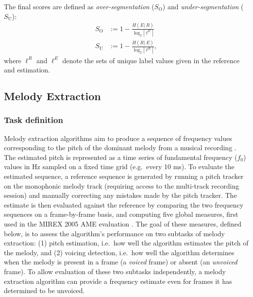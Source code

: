 \documentclass{article}
\def\given{\ensuremath{|~}}
\def\defeq{\ensuremath{:=}}
\begin{document}
The final scores are defined as \emph{over-segmentation} ($S_\text{O}$) and \emph{under-segmentation} ($S_\text{U}$):
\begin{align}
S_\text{O} &\defeq 1 - \frac{H(E \given R)}{\log_2 |\ell^E|}\\
S_\text{U} &\defeq 1 - \frac{H(R \given E)}{\log_2 |\ell^R|},
\end{align}
where $\ell^R$ and $\ell^E$ denote the sets of unique label values given in the reference and estimation.

\subsection{Melody Extraction}
\subsubsection{Task definition}
Melody extraction algorithms aim to produce a sequence of frequency values
corresponding to the pitch of the dominant melody from a musical recording
\cite{salamon:MelodyReview:IEEESPM13}. The estimated pitch is represented as a
time series of fundamental frequency ($f_0$) values in Hz sampled on a fixed
time grid (e.g.~every 10 ms). To evaluate the estimated sequence, a reference
sequence is generated by running a pitch tracker on the monophonic melody track
(requiring access to the multi-track recording session) and manually correcting
any mistakes made by the pitch tracker. The estimate is then evaluated against
the reference by comparing the two frequency sequences on a frame-by-frame
basis, and computing five global measures, first used in the MIREX 2005 AME
evaluation \cite{polinerMelodyEval}. The goal of these measures, defined below,
is to assess the algorithm's performance on two subtasks of melody extraction:
(1) pitch estimation, i.e.~how well the algorithm estimates the pitch of the
melody, and (2) voicing detection, i.e.~how well the algorithm determines when
the melody is present in a frame (a \textit{voiced} frame) or absent (an
\textit{unvoiced} frame). To allow evaluation of these two subtasks
independently, a melody extraction algorithm can provide a frequency estimate
even for frames it has determined to be unvoiced.
\end{document}
